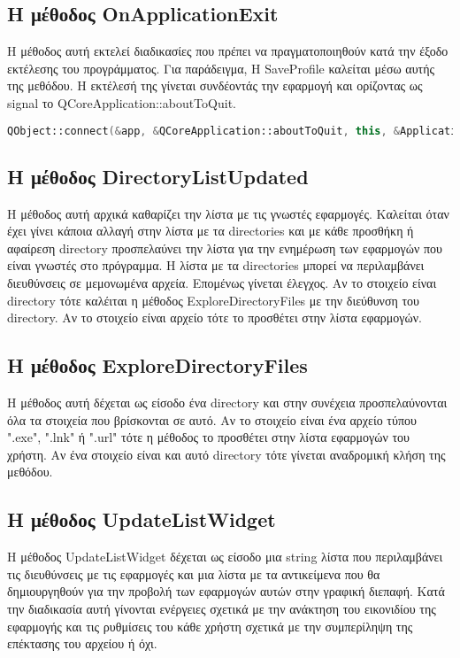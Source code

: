 \subsection{Η μέθοδος OnApplicationExit}
Η μέθοδος αυτή εκτελεί διαδικασίες που πρέπει να πραγματοποιηθούν κατά την έξοδο εκτέλεσης
του προγράμματος. Για παράδειγμα, Η SaveProfile καλείται μέσω αυτής της μεθόδου. Η εκτέλεσή
της γίνεται συνδέοντάς την εφαρμογή και ορίζοντας ως signal το QCoreApplication::aboutToQuit.

\begin{lstlisting}[language=C++, style=cppstyle]
QObject::connect(&app, &QCoreApplication::aboutToQuit, this, &ApplicationExplorer::OnApplicationExit);
\end{lstlisting}

\subsection{Η μέθοδος DirectoryListUpdated}
Η μέθοδος αυτή αρχικά καθαρίζει την λίστα με τις γνωστές εφαρμογές. Καλείται όταν έχει γίνει
κάποια αλλαγή στην λίστα με τα directories και με κάθε προσθήκη ή αφαίρεση directory προσπελαύνει
την λίστα για την ενημέρωση των εφαρμογών που είναι γνωστές στο πρόγραμμα. Η λίστα με τα directories
μπορεί να περιλαμβάνει διευθύνσεις σε μεμονωμένα αρχεία. Επομένως γίνεται έλεγχος. Αν το στοιχείο
είναι directory τότε καλέιται η μέθοδος ExploreDirectoryFiles με την διεύθυνση του directory. Αν
το στοιχείο είναι αρχείο τότε το προσθέτει στην λίστα εφαρμογών.


\subsection{Η μέθοδος ExploreDirectoryFiles}
Η μέθοδος αυτή δέχεται ως είσοδο ένα directory και στην συνέχεια προσπελαύνονται όλα
τα στοιχεία που βρίσκονται σε αυτό. Αν το στοιχείο είναι ένα αρχείο τύπου ".exe", ".lnk"
ή ".url" τότε η μέθοδος το προσθέτει στην λίστα εφαρμογών του χρήστη. Αν ένα στοιχείο 
είναι και αυτό directory τότε γίνεται αναδρομική κλήση της μεθόδου.


\subsection{Η μέθοδος UpdateListWidget}
Η μέθοδος UpdateListWidget δέχεται ως είσοδο μια string λίστα που περιλαμβάνει τις
διευθύνσεις με τις εφαρμογές και μια λίστα με τα αντικείμενα που θα δημιουργηθούν
για την προβολή των εφαρμογών αυτών στην γραφική διεπαφή. Κατά την διαδικασία αυτή
γίνονται ενέργειες σχετικά με την ανάκτηση του εικονιδίου της εφαρμογής και τις
ρυθμίσεις του κάθε χρήστη σχετικά με την συμπερίληψη της επέκτασης του αρχείου ή όχι.

